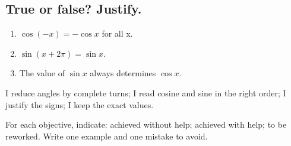 \subsection*{True or false? Justify.}\label{C10-VF}
\begin{enumerate}
\item $\cos(-x)=-\cos x$ for all x.
\item $\sin(x+2\pi)=\sin x$.
\item The value of $\sin x$ always determines $\cos x$.
\end{enumerate}
\begin{keypoint}I reduce angles by complete turns; I read cosine and sine in the right order; I justify the signs; I keep the exact values.

For each objective, indicate: achieved without help; achieved with help; to be reworked. Write one example and one mistake to avoid.\end{keypoint}
\endgroup
\ifmxteacher{}\fi
